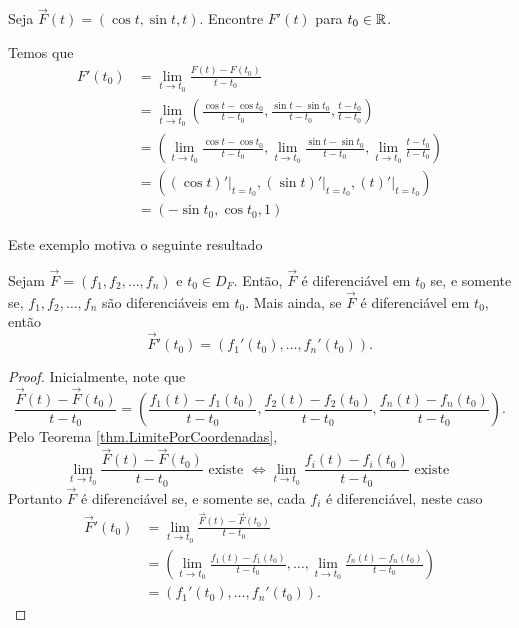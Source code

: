 \begin{example}
    Seja \(\overrightarrow{F}(t) = (\cos t,\sin t, t)\). Encontre \(F'(t)\) para \(t_0\in\mathbb{R}\).

    Temos que
        \begin{align*}
            F'(t_0)
                & = \lim_{t\to t_0} \frac{F(t) - F(t_0)}{t-t_0} \\
                & = \lim_{t\to t_0}\left( \frac{\cos t - \cos t_0}{t-t_0}, \frac{\sin t - \sin t_0}{t-t_0}, \frac{t-t_0}{t-t_0} \right) \\
                & = \left( \lim_{t\to t_0}\frac{\cos t - \cos t_0}{t-t_0}, \lim_{t\to t_0}\frac{\sin t - \sin t_0}{t-t_0}, \lim_{t\to t_0}\frac{t-t_0}{t-t_0} \right) \\
                & = \left( (\cos t)'\big|_{t=t_0}, (\sin t)'\big|_{t=t_0}, (t)'\big|_{t=t_0} \right) \\
                & = (-\sin t_0, \cos t_0, 1)
        \end{align*}
\end{example}

Este exemplo motiva o seguinte resultado

\begin{theorem}
    Sejam \(\overrightarrow{F} = (f_1,f_2,\dots,f_n)\) e \(t_0\in D_F\). Então, \(\overrightarrow{F}\) é diferenciável em \(t_0\) se, e somente se, \(f_1, f_2,\dots,f_n\) são diferenciáveis em \(t_0\). Mais ainda, se \(\overrightarrow{F}\) é diferenciável em \(t_0\), então \[\overrightarrow{F}'(t_0) = (f_1'(t_0), \dots, f_n'(t_0)).\]
\end{theorem}

\begin{proof}
    Inicialmente, note que \[\frac{\overrightarrow{F}(t) - \overrightarrow{F}(t_0)}{t-t_0} = \left( \frac{f_1(t)-f_1(t_0)}{t-t_0}, \frac{f_2(t) - f_2(t_0)}{t-t_0}, \frac{f_n(t) - f_n(t_0)}{t-t_0} \right).\] Pelo Teorema \ref{thm.LimitePorCoordenadas}, \[\lim_{t\to t_0} \frac{\overrightarrow{F}(t) - \overrightarrow{F}(t_0)}{t-t_0} \text{ existe } \Leftrightarrow \lim_{t\to t_0}  \frac{f_i(t) - f_i(t_0)}{t-t_0} \text{ existe }\] Portanto \(\overrightarrow{F}\) é diferenciável se, e somente se, cada \(f_i\) é diferenciável, neste caso
        \begin{align*}
            \overrightarrow{F}'(t_0) 
                & = \lim_{t\to t_0} \frac{\overrightarrow{F}(t) - \overrightarrow{F}(t_0)}{t-t_0}\\ 
                & = \left( \lim_{t\to t_0} \frac{f_1(t) - f_1(t_0)}{t-t_0}, \dots, \lim_{t\to t_0}\frac{f_n(t)-f_n(t_0)}{t-t_0} \right) \\
                & = (f_1'(t_0),\dots,f_n'(t_0)).
        \end{align*}
\end{proof}

